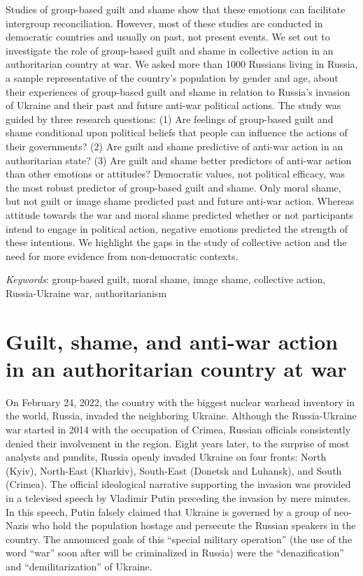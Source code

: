 \documentclass[
]{article}
\begin{document}
Studies of group-based guilt and shame show that these emotions can facilitate intergroup reconciliation. However, most of these studies are conducted in democratic countries and usually on past, not present events. We set out to investigate the role of group-based guilt and shame in collective action in an authoritarian country at war. We asked more than 1000 Russians living in Russia, a sample representative of the country's population by gender and age, about their experiences of group-based guilt and shame in relation to Russia's invasion of Ukraine and their past and future anti-war political actions. The study was guided by three research questions: (1) Are feelings of group-based guilt and shame conditional upon political beliefs that people can influence the actions of their governments? (2) Are guilt and shame predictive of anti-war action in an authoritarian state? (3) Are guilt and shame better predictors of anti-war action than other emotions or attitudes? Democratic values, not political efficacy, was the most robust predictor of group-based guilt and shame. Only moral shame, but not guilt or image shame predicted past and future anti-war action. Whereas attitude towards the war and moral shame predicted whether or not participants intend to engage in political action, negative emotions predicted the strength of these intentions. We highlight the gaps in the study of collective action and the need for more evidence from non-democratic contexts.

\vspace{5mm}

\emph{Keywords}: group-based guilt, moral shame, image shame, collective action, Russia-Ukraine war, authoritarianism

\hypertarget{guilt-shame-and-anti-war-action-in-an-authoritarian-country-at-war}{%
\section*{Guilt, shame, and anti-war action in an authoritarian country at war}\label{guilt-shame-and-anti-war-action-in-an-authoritarian-country-at-war}}

On February 24, 2022, the country with the biggest nuclear warhead inventory in the world, Russia, invaded the neighboring Ukraine. Although the Russia-Ukraine war started in 2014 with the occupation of Crimea, Russian officials consistently denied their involvement in the region. Eight years later, to the surprise of most analysts and pundits, Russia openly invaded Ukraine on four fronts: North (Kyiv), North-East (Kharkiv), South-East (Donetsk and Luhansk), and South (Crimea). The official ideological narrative supporting the invasion was provided in a televised speech by Vladimir Putin preceding the invasion by mere minutes. In this speech, Putin falsely claimed that Ukraine is governed by a group of neo-Nazis who hold the population hostage and persecute the Russian speakers in the country. The announced goals of this ``special military operation'' (the use of the word ``war'' soon after will be criminalized in Russia) were the ``denazification'' and ``demilitarization'' of Ukraine.
\end{document}
